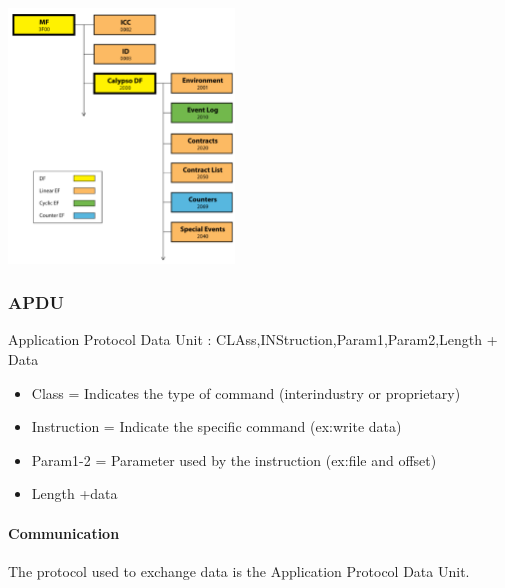 \begin{center}
    \includegraphics[width=6cm]{img/7816}
\end{center}

\subsubsection{APDU}
Application Protocol Data Unit : CLAss,INStruction,Param1,Param2,Length + Data
\begin{itemize}
	\item Class = Indicates the type of command (interindustry or proprietary)
	\item Instruction = Indicate the specific command (ex:write data)
	\item Param1-2 = Parameter used by the instruction (ex:file and offset)
	\item Length +data

\end{itemize}


\paragraph{Communication}
The protocol used to exchange data is the Application Protocol Data Unit.


